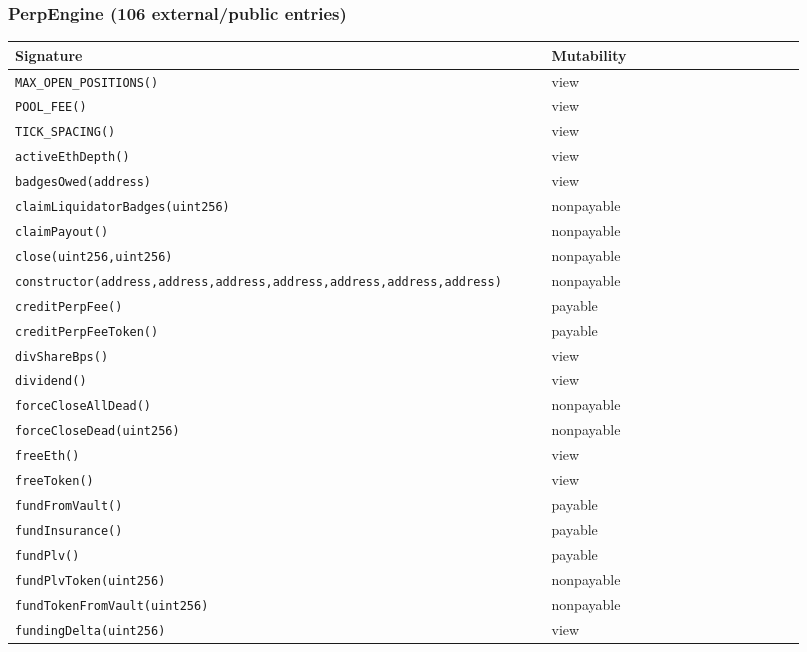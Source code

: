 \subsubsection*{PerpEngine \;\normalfont\small(106 external/public entries)}
\begin{longtable}{@{}p{0.62\linewidth}p{0.30\linewidth}@{}}
\toprule \textbf{Signature} & \textbf{Mutability} \\ \midrule \endhead
\texttt{\scriptsize MAX\_OPEN\_POSITIONS()} & view \\
\texttt{\scriptsize POOL\_FEE()} & view \\
\texttt{\scriptsize TICK\_SPACING()} & view \\
\texttt{\scriptsize activeEthDepth()} & view \\
\texttt{\scriptsize badgesOwed(address)} & view \\
\texttt{\scriptsize claimLiquidatorBadges(uint256)} & nonpayable \\
\texttt{\scriptsize claimPayout()} & nonpayable \\
\texttt{\scriptsize close(uint256,uint256)} & nonpayable \\
\texttt{\scriptsize constructor(address,address,address,address,address,address,address)} & nonpayable \\
\texttt{\scriptsize creditPerpFee()} & payable \\
\texttt{\scriptsize creditPerpFeeToken()} & payable \\
\texttt{\scriptsize divShareBps()} & view \\
\texttt{\scriptsize dividend()} & view \\
\texttt{\scriptsize forceCloseAllDead()} & nonpayable \\
\texttt{\scriptsize forceCloseDead(uint256)} & nonpayable \\
\texttt{\scriptsize freeEth()} & view \\
\texttt{\scriptsize freeToken()} & view \\
\texttt{\scriptsize fundFromVault()} & payable \\
\texttt{\scriptsize fundInsurance()} & payable \\
\texttt{\scriptsize fundPlv()} & payable \\
\texttt{\scriptsize fundPlvToken(uint256)} & nonpayable \\
\texttt{\scriptsize fundTokenFromVault(uint256)} & nonpayable \\
\texttt{\scriptsize fundingDelta(uint256)} & view \\

\end{longtable}
